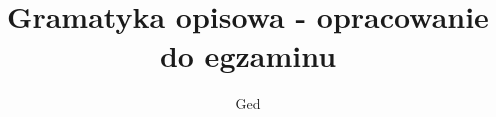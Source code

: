 \documentclass[12pt]{wzmgr}
\author{Ged}
\title{Gramatyka opisowa - opracowanie do egzaminu}
\begin{document}
\onehalfspacing
\maketitle







\printindex
\end{document}
